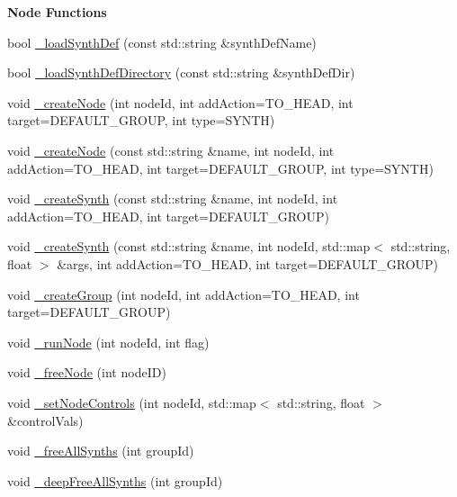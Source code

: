 \begin{Indent}{\bf Node Functions}\par
\begin{DoxyCompactItemize}
\item 
bool \hyperlink{classColliderPlusPlus_1_1Client__Server_a8aba41e38cf5d292adf2b759ff637f79}{\-\_\-load\-Synth\-Def} (const std\-::string \&synth\-Def\-Name)
\item 
bool \hyperlink{classColliderPlusPlus_1_1Client__Server_ab980baddbd3905e2dc8b429d2b71d83c}{\-\_\-load\-Synth\-Def\-Directory} (const std\-::string \&synth\-Def\-Dir)
\item 
void \hyperlink{classColliderPlusPlus_1_1Client__Server_a29c6c0fd0bd45dc08520f7899954dbdf}{\-\_\-create\-Node} (int node\-Id, int add\-Action=T\-O\-\_\-\-H\-E\-A\-D, int target=D\-E\-F\-A\-U\-L\-T\-\_\-\-G\-R\-O\-U\-P, int type=S\-Y\-N\-T\-H)
\item 
void \hyperlink{classColliderPlusPlus_1_1Client__Server_a132d13603d1a0f2c51eff83718e8561d}{\-\_\-create\-Node} (const std\-::string \&name, int node\-Id, int add\-Action=T\-O\-\_\-\-H\-E\-A\-D, int target=D\-E\-F\-A\-U\-L\-T\-\_\-\-G\-R\-O\-U\-P, int type=S\-Y\-N\-T\-H)
\item 
void \hyperlink{classColliderPlusPlus_1_1Client__Server_a1ff94df5092263456350196a13a12cc2}{\-\_\-create\-Synth} (const std\-::string \&name, int node\-Id, int add\-Action=T\-O\-\_\-\-H\-E\-A\-D, int target=D\-E\-F\-A\-U\-L\-T\-\_\-\-G\-R\-O\-U\-P)
\item 
void \hyperlink{classColliderPlusPlus_1_1Client__Server_ad72cc7de9811b12ea63815cc17dabe8d}{\-\_\-create\-Synth} (const std\-::string \&name, int node\-Id, std\-::map$<$ std\-::string, float $>$ \&args, int add\-Action=T\-O\-\_\-\-H\-E\-A\-D, int target=D\-E\-F\-A\-U\-L\-T\-\_\-\-G\-R\-O\-U\-P)
\item 
void \hyperlink{classColliderPlusPlus_1_1Client__Server_a5f13a514f42e2e7bb0ae975f046f7c17}{\-\_\-create\-Group} (int node\-Id, int add\-Action=T\-O\-\_\-\-H\-E\-A\-D, int target=D\-E\-F\-A\-U\-L\-T\-\_\-\-G\-R\-O\-U\-P)
\item 
void \hyperlink{classColliderPlusPlus_1_1Client__Server_ab48df010f59d4b4f8275cf6d6b9859eb}{\-\_\-run\-Node} (int node\-Id, int flag)
\item 
void \hyperlink{classColliderPlusPlus_1_1Client__Server_af22d109a9292a06808871100bdf0abe4}{\-\_\-free\-Node} (int node\-I\-D)
\item 
void \hyperlink{classColliderPlusPlus_1_1Client__Server_a0620f55c7167c3094143d905647bf439}{\-\_\-set\-Node\-Controls} (int node\-Id, std\-::map$<$ std\-::string, float $>$ \&control\-Vals)
\item 
void \hyperlink{classColliderPlusPlus_1_1Client__Server_abab1835658a244782d96777bf88192ed}{\-\_\-free\-All\-Synths} (int group\-Id)
\item 
void \hyperlink{classColliderPlusPlus_1_1Client__Server_a0c39de34592133a18a977a967bd1dc7a}{\-\_\-deep\-Free\-All\-Synths} (int group\-Id)
\end{DoxyCompactItemize}
\end{Indent}
